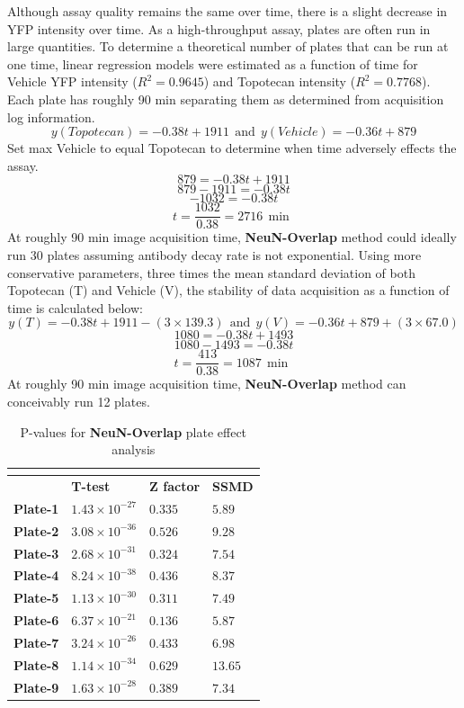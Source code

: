 Although assay quality remains the same over time, there is a slight decrease in YFP intensity over time. As a high-throughput assay, plates are often run in large quantities. To determine a theoretical number of plates that can be run at one time, linear regression models were estimated as a function of time for Vehicle YFP intensity (\( R^2 = 0.9645 \)) and Topotecan intensity (\( R^2 = 0.7768 \)). Each plate has roughly 90 min separating them as determined from acquisition log information.
\[ y(Topotecan) = -0.38t + 1911 \ \ \textrm{and} \ \ y(Vehicle) = -0.36t + 879 \]
Set max Vehicle to equal Topotecan to determine when time adversely effects the assay.
\[ 879 = -0.38t + 1911 \]
\[ 879 - 1911 = -0.38t \]
\[ -1032 = -0.38t \]
\[ t = \frac{1032}{0.38}  = 2716 \ \ \textrm{min} \ \ \]
At roughly 90 min image acquisition time, \textbf{NeuN-Overlap} method could ideally run 30 plates assuming antibody decay rate is not exponential. Using more conservative parameters, three times the mean standard deviation of both Topotecan (T) and Vehicle (V), the stability of data acquisition as a function of time is calculated below:
\[ y(T) = -0.38t + 1911 - (3 \times 139.3) \ \ \textrm{and} \ \ y(V) = -0.36t + 879 + (3 \times 67.0) \]
\[ 1080 = -0.38t + 1493 \]
\[ 1080 - 1493 = -0.38t \]
\[ t = \frac{413}{0.38} = 1087 \ \ \textrm{min} \ \ \]
At roughly 90 min image acquisition time, \textbf{NeuN-Overlap} method can conceivably run 12 plates.

\begin{longtabu} to 5in {X[l]X[c]X[c]X[c]}
  \caption{P-values for \textbf{NeuN-Overlap} plate effect analysis}\\
  \label{table:5-2}\\
  \toprule
  & \textbf{T-test} & \textbf{Z factor} & \textbf{SSMD}\\
  \midrule
  \endhead
  \textbf{Plate-1}  & $1.43 \times 10^{-27}$ & $0.335$ & $5.89$  \\
  \textbf{Plate-2}  & $3.08 \times 10^{-36}$ & $0.526$ & $9.28$  \\
  \textbf{Plate-3}  & $2.68 \times 10^{-31}$ & $0.324$ & $7.54$  \\
  \textbf{Plate-4}  & $8.24 \times 10^{-38}$ & $0.436$ & $8.37$  \\
  \textbf{Plate-5}  & $1.13 \times 10^{-30}$ & $0.311$ & $7.49$  \\
  \textbf{Plate-6}  & $6.37 \times 10^{-21}$ & $0.136$ & $5.87$  \\
  \textbf{Plate-7}  & $3.24 \times 10^{-26}$ & $0.433$ & $6.98$  \\
  \textbf{Plate-8}  & $1.14 \times 10^{-34}$ & $0.629$ & $13.65$ \\
  \textbf{Plate-9}  & $1.63 \times 10^{-28}$ & $0.389$ & $7.34$  \\
  \bottomrule
\end{longtabu}

